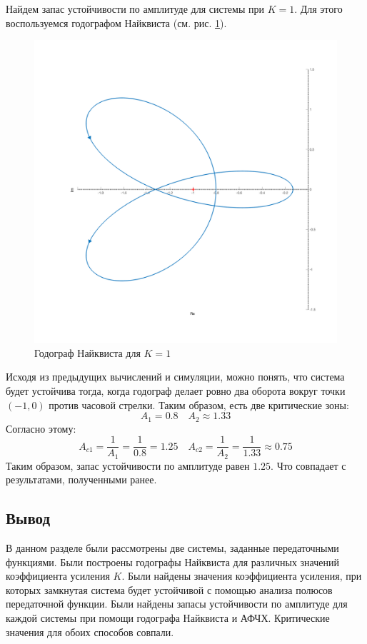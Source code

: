 Найдем запас устойчивости по амплитуде для системы при $K = 1$. Для этого воспользуемся 
годографом Найквиста (см. рис. \ref{fig:task5_nyquist}).
\begin{figure}[ht!]
    \centering
    \includegraphics[width=\textwidth]{media/plots/task5_nyquist_1.png}
    \caption{Годограф Найквиста для $K = 1$}
    \label{fig:task5_nyquist}
\end{figure}
Исходя из предыдущих вычислений и симуляции, можно понять, что система будет устойчива тогда, когда 
годограф делает ровно два оборота вокруг точки $(-1, 0)$ против часовой стрелки. 
Таким образом, есть две критические зоны: 
\begin{equation}
    A_1 = 0.8 \quad A_2 \approx 1.33 
\end{equation}
Согласно этому: 
\begin{equation}
    A_{c1} = \frac{1}{A_1} = \frac{1}{0.8} = 1.25 \quad A_{c2} = \frac{1}{A_2} = \frac{1}{1.33} \approx 0.75
\end{equation}
Таким образом, запас устойчивости по амплитуде равен $1.25$. 
Что совпадает с результатами, полученными ранее.

\subsection{Вывод}
В данном разделе были рассмотрены две системы, заданные передаточными функциями.
Были построены годографы Найквиста для различных значений коэффициента усиления $K$.
Были найдены значения коэффициента усиления, при которых замкнутая система будет устойчивой с помощью 
анализа полюсов передаточной функции.
Были найдены запасы устойчивости по амплитуде для каждой системы при помощи годографа Найквиста и АФЧХ. 
Критические значения для обоих способов совпали. 